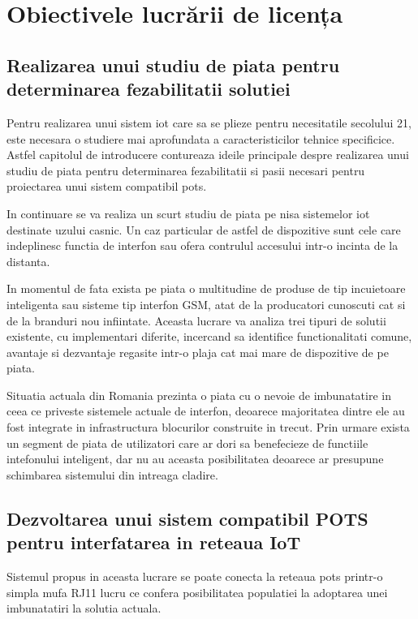 \section {Obiectivele lucrării de licența}

\subsection {Realizarea unui studiu de piata pentru determinarea fezabilitatii solutiei}

Pentru realizarea unui sistem \acrfull{iot} care sa se plieze pentru necesitatile secolului 21, este necesara o studiere mai aprofundata a caracteristicilor tehnice specificice. Astfel capitolul de introducere contureaza ideile principale despre realizarea unui studiu de piata pentru determinarea fezabilitatii si pasii necesari pentru proiectarea unui sistem compatibil \acrshort{pots}.

In continuare se va realiza un scurt studiu de piata pe nisa sistemelor \acrshort{iot} destinate uzului casnic. Un caz particular de astfel de dispozitive sunt cele care indeplinesc functia de interfon sau ofera contrulul accesului intr-o incinta de la distanta.

In momentul de fata exista pe piata o multitudine de produse de tip incuietoare inteligenta sau sisteme tip interfon GSM, atat de la producatori cunoscuti cat si de la branduri nou infiintate. Aceasta lucrare va analiza trei tipuri de solutii existente, cu implementari diferite, incercand sa identifice functionalitati comune, avantaje si dezvantaje regasite intr-o plaja cat mai mare de dispozitive de pe piata.

Situatia actuala din Romania prezinta o piata cu o nevoie de imbunatatire in ceea ce priveste sistemele actuale de interfon, deoarece majoritatea dintre ele au fost integrate in infrastructura blocurilor construite in trecut. Prin urmare exista un segment de piata de utilizatori care ar dori sa benefecieze de functiile intefonului inteligent, dar nu au aceasta posibilitatea deoarece ar presupune schimbarea sistemului din intreaga cladire.


\subsection {Dezvoltarea unui sistem compatibil POTS pentru interfatarea in reteaua IoT}

Sistemul propus in aceasta lucrare se poate conecta la reteaua \acrfull{pots} printr-o simpla mufa RJ11 lucru ce confera posibilitatea populatiei la adoptarea unei imbunatatiri la solutia actuala.


